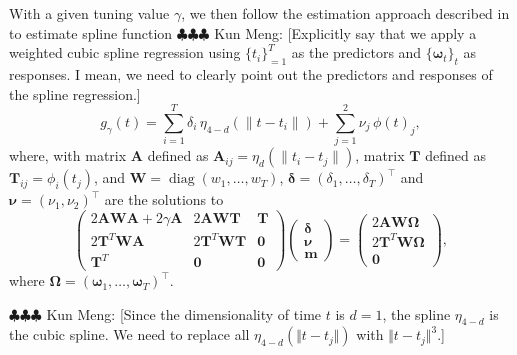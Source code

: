 \documentclass[11pt,reqno]{article}
\newcommand{\T}{\intercal}
\newcommand{\meng}[1]{{\color{purple} \sf $\clubsuit\clubsuit\clubsuit$ Kun Meng: [#1]}}
\theoremstyle{definition}
\begin{document}
With a given tuning value $\gamma$, we then follow the estimation approach described in \cite{mengPrincipalManifoldEstimation2021} to estimate spline function \meng{Explicitly say that we apply a weighted cubic spline regression using $\{t_i\}_{=1}^T$ as the predictors and $\{\boldsymbol{\omega}_t\}_t$ as responses. I mean, we need to clearly point out the predictors and responses of the spline regression.}
\begin{equation}
  g_{\gamma}(t) = \sum_{i=1}^{T}\delta_i \,\eta_{4-d}\left(\|t - t_i\|\right) + \sum_{j=1}^{2}\nu_j\,\phi(t)_j, \label{eq:15}
\end{equation}
where, with matrix $\boldsymbol{A}$ defined as $\boldsymbol{A}_{ij} = \eta_d\left(\|t_i - t_j\|\right)$, matrix $\boldsymbol{T}$ defined as $\boldsymbol{T}_{ij} = \phi_i(t_j)$, and $\boldsymbol{W} = \operatorname{diag}(w_1, \dots, w_T)$,  $\boldsymbol{\delta}=(\delta_1,\ldots,\delta_T)^\T$ and $\boldsymbol{\nu}=(\nu_1,\nu_2)^\T$ are the solutions to 
\begin{equation}
  \left(
  \begin{array}{ccc}
    2\boldsymbol{A}\boldsymbol{W}\boldsymbol{A} + 2\gamma\boldsymbol{A} & 2\boldsymbol{A}\boldsymbol{W}\boldsymbol{T} & \boldsymbol{T} \\
    2\boldsymbol{T}^{T}\boldsymbol{W}\boldsymbol{A} & 2\boldsymbol{T}^{T}\boldsymbol{W}\boldsymbol{T} & \boldsymbol{0} \\
    \boldsymbol{T}^{T} & \boldsymbol{0} & \boldsymbol{0}
  \end{array}
  \right)\left(
  \begin{array}{c}
    \boldsymbol{\delta} \\
    \boldsymbol{\nu} \\
    \boldsymbol{m}
  \end{array}
  \right) = \left(
  \begin{array}{c}
    2\boldsymbol{A}\boldsymbol{W}\boldsymbol{\Omega} \\
    2\boldsymbol{T}^{T}\boldsymbol{W}\boldsymbol{\Omega} \\
    \boldsymbol{0}
  \end{array}
  \right), \label{eq:16}
\end{equation}
where $\boldsymbol{\Omega}=(\boldsymbol{\omega}_1,\ldots, \boldsymbol{\omega}_T)^\T$.

\meng{Since the dimensionality of time $t$ is $d=1$, the spline $\eta_{4-d}$ is the cubic spline. We need to replace all $\eta_{4-d}(\Vert t-t_j\Vert)$ with $\Vert t-t_j\Vert^3$.}
\end{document}
